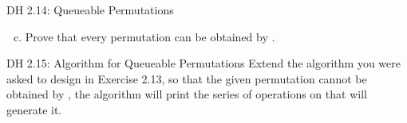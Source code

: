 \begin{frame}{}
  \begin{exampleblock}{DH 2.14: Queueable Permutations}
    \begin{enumerate}[(a)]
      \setcounter{enumi}{2}
      \item Prove that every permutation can be obtained by .
    \end{enumerate}
  \end{exampleblock}
\end{frame}

\begin{frame}{}
  \begin{exampleblock}{DH 2.15: Algorithm for Queueable Permutations}
    Extend the algorithm you were asked to design in Exercise 2.13,
    so that  the given permutation cannot be obtained by ,
    the algorithm will print the series of operations on  that will generate it.
  \end{exampleblock}
\end{frame}

\begin{frame}{}
  \begin{columns}
  \end{columns}

  \vspace{0.80cm}
  \begin{columns}
  \end{columns}
\end{frame}

\begin{frame}{}
  \begin{columns}

      \vspace{0.80cm}
  \end{columns}
\end{frame}

